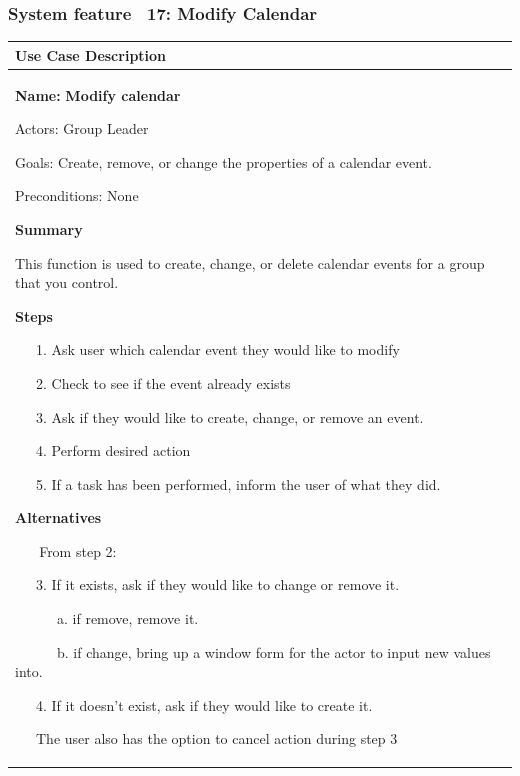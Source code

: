 \documentclass[letterpaper]{article}
\newcommand\textstyleDefaultParagraphFont[1]{#1}
\begin{document}
\subsubsection[System feature \ 17: Modify Calendar]{\rmfamily System
feature \ 17: Modify Calendar}
\begin{flushleft}
\tablehead{}
\begin{supertabular}{|m{4.98376in}|}
\hline
\bfseries\color{black} Use Case Description\\\hline
{\color{black} \textstyleDefaultParagraphFont{\textbf{Name:
}}\textstyleDefaultParagraphFont{\textsf{\textbf{Modify calendar}}}}

{\color{black} Actors: Group Leader}

{\color{black} Goals: Create, remove, or change the properties of a
calendar event.}

{\color{black} Preconditions: None}

{\bfseries\color{black} Summary}

{\color{black} This function is used to create, change, or delete
calendar events for a group that you control.}

{\bfseries\color{black} Steps}

{\color{black} \ \ \ 1. Ask user which calendar event they would like to
modify}

{\color{black} \ \ \ 2. Check to see if the event already exists}

{\color{black} \ \ \ 3. Ask if they would like to create, change, or
remove an event.}

{\color{black} \ \ \ 4. Perform desired action}

{\color{black} \ \ \ 5. If a task has been performed, inform the user of
what they did.}

{\bfseries\color{black} Alternatives}

{\color{black} \textstyleDefaultParagraphFont{\textbf{\ \ \ }}From step
2:}

{\color{black} \ \ \ 3. If it exists, ask if they would like to change
or remove it.}

{\color{black} \ \ \ \ \ \ a. if remove, remove it.}

{\color{black} \ \ \ \ \ \ b. if change, bring up a window form for the
actor to input new values into.}

{\color{black} \ \ \ 4. If it doesn{\textquoteright}t exist, ask if they
would like to create it.}

\color{black} \ \ \ The user also has the option to cancel action during
step 3\\\hline
\end{supertabular}
\end{flushleft}
\end{document}
